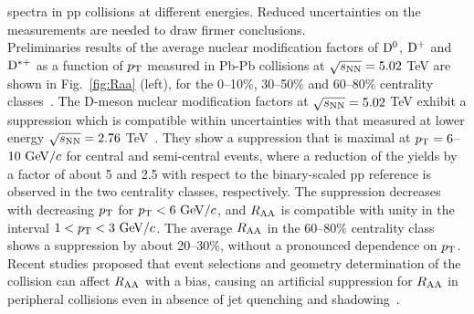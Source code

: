 spectra in pp collisions at different energies. Reduced uncertainties
on the measurements are needed to draw firmer conclusions.\\
Preliminaries results of the average nuclear modification factors 
of ${\rm D^0}$, ${\rm D^+}$ and ${\rm D^{*+}}$ as a function of
$p_{\rm T}$ measured in Pb-Pb collisions at $\sqrt{s_{\rm NN}} = 5.02 $ TeV 
are shown in Fig.~\ref{fig:Raa} (left), 
for the 0--10\%, 30--50\% and 60--80\% centrality classes~\cite{ALICE-PUBLIC-2017-003}. 
The D-meson nuclear modification factors at $\sqrt{s_{\rm NN}} = 5.02$ TeV 
exhibit a suppression which is compatible within uncertainties 
with that measured at lower energy $\sqrt{s_{\rm NN}} = 2.76$ TeV~\cite{Adam:2015sza}. 
They show a suppression that is
maximal at $p_{\rm T}=6$--$10~\mathrm{GeV}/c$ for central and semi-central events, 
where a reduction of the yields by
a factor of about 5 and 2.5 with respect to the binary-scaled pp reference is observed 
in the two centrality classes, respectively.
The suppression decreases with decreasing $p_{\rm T}$ for $p_{\rm T}<6~\mathrm{GeV}/c$, and 
$R_{\rm AA}$ is compatible with unity  in the interval $1<p_{\rm T}<3~\mathrm{GeV}/c$.
The average $R_{\rm AA}$ in the 60--80\% centrality class shows a suppression 
by about 20--30\%, without a pronounced dependence on $p_{\rm T}$. 
Recent studies proposed that event selections and geometry determination 
of the collision can affect $R_{\rm AA}$ with a bias, causing
an artificial suppression for $R_{\rm AA}$ in peripheral collisions even in absence
of jet quenching and shadowing~\cite{Morsch:2017brb}.\\


